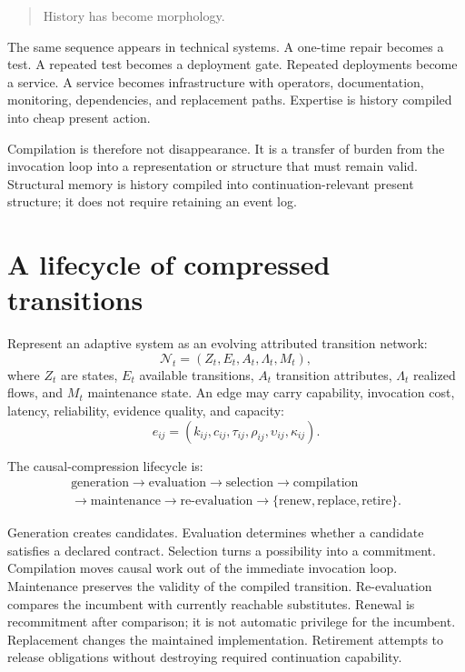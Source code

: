 \documentclass[11pt]{article}
\begin{document}
\begin{quote}
History has become morphology.
\end{quote}

The same sequence appears in technical systems. A one-time repair becomes a test. A repeated test becomes a deployment gate. Repeated deployments become a service. A service becomes infrastructure with operators, documentation, monitoring, dependencies, and replacement paths. Expertise is history compiled into cheap present action.

Compilation is therefore not disappearance. It is a transfer of burden from the invocation loop into a representation or structure that must remain valid. Structural memory is history compiled into continuation-relevant present structure; it does not require retaining an event log.

\section{A lifecycle of compressed transitions}

Represent an adaptive system as an evolving attributed transition network:
\[
\mathcal{N}_t=(Z_t,E_t,A_t,\Lambda_t,M_t),
\]
where \(Z_t\) are states, \(E_t\) available transitions, \(A_t\) transition attributes, \(\Lambda_t\) realized flows, and \(M_t\) maintenance state. An edge may carry capability, invocation cost, latency, reliability, evidence quality, and capacity:
\[
e_{ij}=(k_{ij},c_{ij},\tau_{ij},\rho_{ij},\upsilon_{ij},\kappa_{ij}).
\]

The causal-compression lifecycle is:
\[
\begin{gathered}
\text{generation}\rightarrow\text{evaluation}\rightarrow\text{selection}\rightarrow\text{compilation}\\
\rightarrow\text{maintenance}\rightarrow\text{re-evaluation}\rightarrow
\{\text{renew},\text{replace},\text{retire}\}.
\end{gathered}
\]

Generation creates candidates. Evaluation determines whether a candidate satisfies a declared contract. Selection turns a possibility into a commitment. Compilation moves causal work out of the immediate invocation loop. Maintenance preserves the validity of the compiled transition. Re-evaluation compares the incumbent with currently reachable substitutes. Renewal is recommitment after comparison; it is not automatic privilege for the incumbent. Replacement changes the maintained implementation. Retirement attempts to release obligations without destroying required continuation capability.
\end{document}
